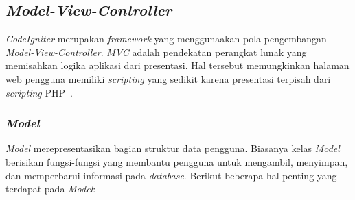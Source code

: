 \subsection{\textit{Model-View-Controller}}
\textit{CodeIgniter} merupakan \textit{framework} yang menggunaakan pola pengembangan \textit{Model-View-Controller}. \textit{MVC} adalah pendekatan perangkat lunak yang memisahkan logika aplikasi dari presentasi. Hal tersebut memungkinkan halaman web pengguna memiliki \textit{scripting} yang sedikit karena presentasi terpisah dari \textit{scripting} PHP~\cite{bcit:17:cidoc}. \\

	\subsubsection{\textit{Model}}
	\textit{Model} merepresentasikan bagian struktur data pengguna. Biasanya kelas \textit{Model} berisikan fungsi-fungsi yang membantu pengguna untuk mengambil, menyimpan, dan memperbarui informasi pada \textit{database}. Berikut beberapa hal penting yang terdapat pada \textit{Model}:
